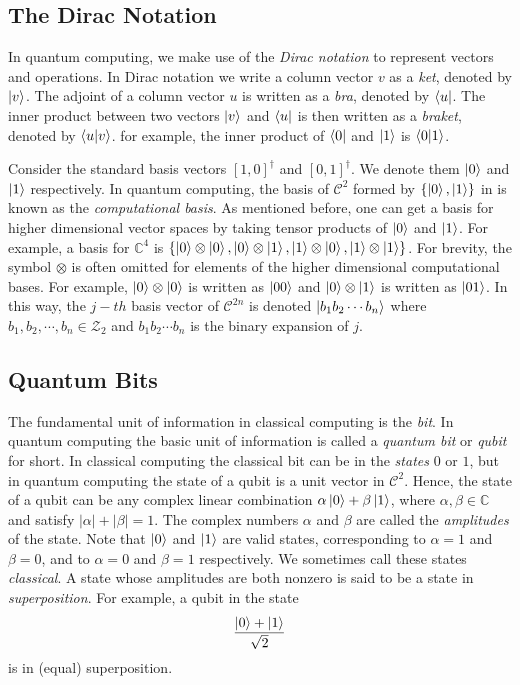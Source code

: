 \documentclass[12pt]{dalthesis}
\begin{document}
\subsection{The Dirac Notation}
In quantum computing, we make use of the \emph{Dirac notation} to represent vectors and operations. In Dirac notation we write a column vector $v$ as a \emph{ket}, denoted by $\ket{v}$. The adjoint of a column vector $u$ is written as a \emph{bra}, denoted by $\bra{u}$. The inner product between two vectors $\ket{v}$ and $\bra{u}$ is then written as a \emph{braket}, denoted by $\braket{u|v}$. for example, the inner product of $\bra{0}$ and $\ket{1}$ is $\braket{0|1}$.

Consider the standard basis vectors $[1, 0]^{\dag}$ and $[0, 1]^{\dag}$. We denote them $\ket{0}$ and $\ket{1}$ respectively. In quantum computing, the basis of $\mathcal{C}^2$ formed by $\{ \ket{0} , \ket{1} \}$ in is known as the \emph{computational basis}. As mentioned before, one can get a basis for higher dimensional vector spaces by taking tensor products of $\ket{0}$ and $\ket{1}$. For example, a basis for $\mathbb{C}^4$ is $\{ \ket{0} \otimes \ket{0}, \ket{0} \otimes \ket{1}, \ket{1} \otimes \ket{0}, \ket{1} \otimes \ket{1} \}$. For brevity, the symbol $\otimes$ is often omitted for elements of the higher dimensional computational bases. For example, $\ket{0} \otimes \ket{0}$ is written as $\ket{00}$ and $\ket{0} \otimes \ket{1}$ is written as $\ket{01}$. In this way, the $j-th$ basis vector of $\mathcal{C}^{2n}$ is denoted $\ket{b_1 b_2 \cdots b_n}$ where $b_1, b_2, \cdots , b_n \in \mathcal{Z}_2$ and $b_1 b_2 \cdots b_n$ is the binary expansion of $j$.

\subsection{Quantum Bits}
The fundamental unit of information in classical computing is the \emph{bit}. In quantum computing the basic unit of information is called a \emph{quantum bit} or \emph{qubit} for short. In classical computing the classical bit can be in the \emph{states} $0$ or $1$, but in quantum computing the state of a qubit is a unit vector in $\mathcal{C}^2$. Hence, the state of a qubit can be any complex linear combination $\alpha \ket{0} + \beta \ket{1}$, where $\alpha , \beta \in \mathbb{C}$ and satisfy $|\alpha | + |\beta | = 1$. The complex numbers $\alpha$ and $\beta$ are called the \emph{amplitudes} of the state. Note that $\ket{0}$ and $\ket{1}$ are valid states, corresponding to $\alpha = 1$ and $\beta = 0$, and to $\alpha = 0$ and $\beta = 1$ respectively. We sometimes call these states \emph{classical}. A state whose amplitudes are both nonzero is said to be a state in \emph{superposition}. For example, a qubit in the state \[ \frac{\ket{0} + \ket{1}}{\sqrt{2}} \] is in (equal) superposition.
\end{document}
